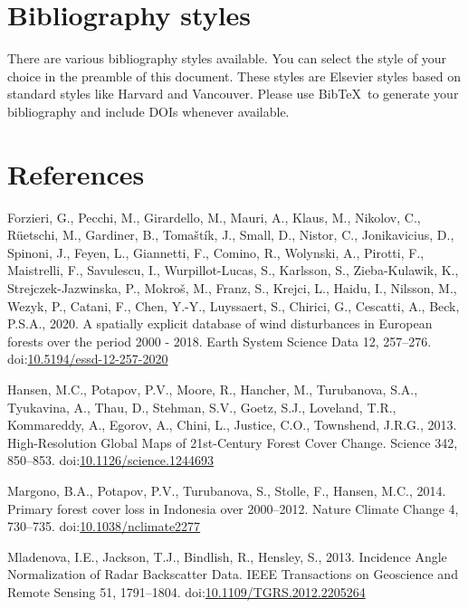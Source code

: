 \documentclass[]{elsarticle} %
\begin{document}
\hypertarget{bibliography-styles}{%
\section{Bibliography styles}\label{bibliography-styles}}

There are various bibliography styles available. You can select the
style of your choice in the preamble of this document. These styles are
Elsevier styles based on standard styles like Harvard and Vancouver.
Please use BibTeX~to generate your bibliography and include DOIs
whenever available.

\hypertarget{references}{%
\section*{References}\label{references}}

\hypertarget{refs}{}
\leavevmode\hypertarget{ref-Forzieri2020}{}%
Forzieri, G., Pecchi, M., Girardello, M., Mauri, A., Klaus, M., Nikolov,
C., Rüetschi, M., Gardiner, B., Tomaštík, J., Small, D., Nistor, C.,
Jonikavicius, D., Spinoni, J., Feyen, L., Giannetti, F., Comino, R.,
Wolynski, A., Pirotti, F., Maistrelli, F., Savulescu, I.,
Wurpillot-Lucas, S., Karlsson, S., Zieba-Kulawik, K.,
Strejczek-Jazwinska, P., Mokroš, M., Franz, S., Krejci, L., Haidu, I.,
Nilsson, M., Wezyk, P., Catani, F., Chen, Y.-Y., Luyssaert, S., Chirici,
G., Cescatti, A., Beck, P.S.A., 2020. A spatially explicit database of
wind disturbances in European forests over the period 2000 - 2018. Earth
System Science Data 12, 257--276.
doi:\href{https://doi.org/10.5194/essd-12-257-2020}{10.5194/essd-12-257-2020}

\leavevmode\hypertarget{ref-Hansen2013}{}%
Hansen, M.C., Potapov, P.V., Moore, R., Hancher, M., Turubanova, S.A.,
Tyukavina, A., Thau, D., Stehman, S.V., Goetz, S.J., Loveland, T.R.,
Kommareddy, A., Egorov, A., Chini, L., Justice, C.O., Townshend, J.R.G.,
2013. High-Resolution Global Maps of 21st-Century Forest Cover Change.
Science 342, 850--853.
doi:\href{https://doi.org/10.1126/science.1244693}{10.1126/science.1244693}

\leavevmode\hypertarget{ref-Margono2014}{}%
Margono, B.A., Potapov, P.V., Turubanova, S., Stolle, F., Hansen, M.C.,
2014. Primary forest cover loss in Indonesia over 2000--2012. Nature
Climate Change 4, 730--735.
doi:\href{https://doi.org/10.1038/nclimate2277}{10.1038/nclimate2277}

\leavevmode\hypertarget{ref-Mladenova2013}{}%
Mladenova, I.E., Jackson, T.J., Bindlish, R., Hensley, S., 2013.
Incidence Angle Normalization of Radar Backscatter Data. IEEE
Transactions on Geoscience and Remote Sensing 51, 1791--1804.
doi:\href{https://doi.org/10.1109/TGRS.2012.2205264}{10.1109/TGRS.2012.2205264}
\end{document}
